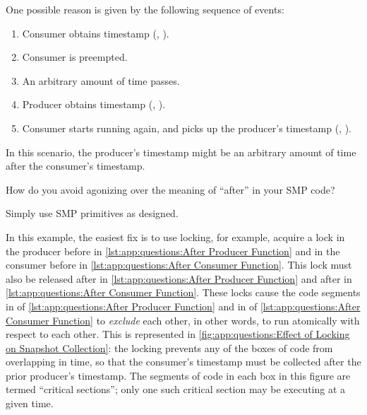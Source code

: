 \begin{lineref}
One possible reason is given by the following sequence of events:
\begin{enumerate}
\item	Consumer obtains timestamp
	(,
	).
\item	Consumer is preempted.
\item	An arbitrary amount of time passes.
\item	Producer obtains timestamp
	(,
	).
\item	Consumer starts running again, and picks up the producer's
	timestamp
	(,
	).
\end{enumerate}

In this scenario, the producer's timestamp might be an arbitrary
amount of time after the consumer's timestamp.

How do you avoid agonizing over the meaning of ``after'' in your
SMP code?

Simply use SMP primitives as designed.

In this example, the easiest fix is to use locking, for example,
acquire a lock in the producer before  in
\cref{lst:app:questions:After Producer Function} and in
the consumer before  in
\cref{lst:app:questions:After Consumer Function}.
This lock must also be released after  in
\cref{lst:app:questions:After Producer Function} and
after  in
\cref{lst:app:questions:After Consumer Function}.
These locks cause the code segments in
 of
\cref{lst:app:questions:After Producer Function} and in
 of
\cref{lst:app:questions:After Consumer Function} to {\em exclude}
each other, in other words, to run atomically with respect to each other.
This is represented in
\cref{fig:app:questions:Effect of Locking on Snapshot Collection}:
the locking prevents any of the boxes of code from overlapping in time, so
that the consumer's timestamp must be collected after the prior
producer's timestamp.
The segments of code in each box in this figure are termed
``critical sections''; only one such critical section may be executing
at a given time.
\end{lineref}

